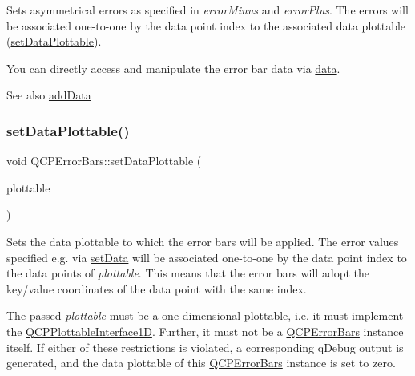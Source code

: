 Sets asymmetrical errors as specified in {\itshape error\+Minus} and {\itshape error\+Plus}. The errors will be associated one-\/to-\/one by the data point index to the associated data plottable (\mbox{\hyperlink{class_q_c_p_error_bars_aabb42a964cfbf780cd1c79850c7cd989}{set\+Data\+Plottable}}).

You can directly access and manipulate the error bar data via \mbox{\hyperlink{class_q_c_p_error_bars_aeebd1b14f4c3573565efafd514988813}{data}}.

\begin{DoxySeeAlso}{See also}
\mbox{\hyperlink{class_q_c_p_error_bars_aae296ad9817b3fa418db284af81cecf8}{add\+Data}} 
\end{DoxySeeAlso}
\mbox{\label{class_q_c_p_error_bars_aabb42a964cfbf780cd1c79850c7cd989}} 
\subsubsection{\texorpdfstring{setDataPlottable()}{setDataPlottable()}}
{\footnotesize\ttfamily void Q\+C\+P\+Error\+Bars\+::set\+Data\+Plottable (\begin{DoxyParamCaption}\item[{\mbox{\hyperlink{class_q_c_p_abstract_plottable}{Q\+C\+P\+Abstract\+Plottable}} $\ast$}]{plottable }\end{DoxyParamCaption})}

Sets the data plottable to which the error bars will be applied. The error values specified e.\+g. via \mbox{\hyperlink{class_q_c_p_error_bars_a92b1980003255f5f7c05407a4d92aabc}{set\+Data}} will be associated one-\/to-\/one by the data point index to the data points of {\itshape plottable}. This means that the error bars will adopt the key/value coordinates of the data point with the same index.

The passed {\itshape plottable} must be a one-\/dimensional plottable, i.\+e. it must implement the \mbox{\hyperlink{class_q_c_p_plottable_interface1_d}{Q\+C\+P\+Plottable\+Interface1D}}. Further, it must not be a \mbox{\hyperlink{class_q_c_p_error_bars}{Q\+C\+P\+Error\+Bars}} instance itself. If either of these restrictions is violated, a corresponding q\+Debug output is generated, and the data plottable of this \mbox{\hyperlink{class_q_c_p_error_bars}{Q\+C\+P\+Error\+Bars}} instance is set to zero.


